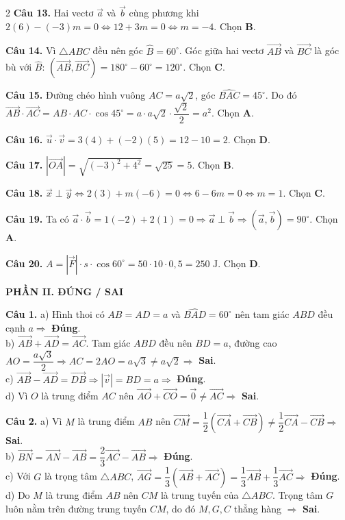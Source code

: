 \documentclass[10pt,a4paper]{article}
\begin{document}
\begin{multicols}{2}
\textbf{Câu 13.} Hai vectơ $\vec{a}$ và $\vec{b}$ cùng phương khi $2(6) - (-3)m = 0 \Leftrightarrow 12 + 3m = 0 \Leftrightarrow m = -4$. Chọn \textbf{B}.

\textbf{Câu 14.} Vì $\triangle ABC$ đều nên góc $\widehat{B} = 60^\circ$. Góc giữa hai vectơ $\vec{AB}$ và $\vec{BC}$ là góc bù với $\widehat{B}$: $(\vec{AB}, \vec{BC}) = 180^\circ - 60^\circ = 120^\circ$. Chọn \textbf{C}.

\textbf{Câu 15.} Đường chéo hình vuông $AC = a\sqrt{2}$, góc $\widehat{BAC} = 45^\circ$. Do đó $\vec{AB} \cdot \vec{AC} = AB \cdot AC \cdot \cos 45^\circ = a \cdot a\sqrt{2} \cdot \dfrac{\sqrt{2}}{2} = a^2$. Chọn \textbf{A}.

\textbf{Câu 16.} $\vec{u} \cdot \vec{v} = 3(4) + (-2)(5) = 12 - 10 = 2$. Chọn \textbf{D}.

\textbf{Câu 17.} $|\vec{OA}| = \sqrt{(-3)^2 + 4^2} = \sqrt{25} = 5$. Chọn \textbf{B}.

\textbf{Câu 18.} $\vec{x} \perp \vec{y} \Leftrightarrow 2(3) + m(-6) = 0 \Leftrightarrow 6 - 6m = 0 \Leftrightarrow m = 1$. Chọn \textbf{C}.

\textbf{Câu 19.} Ta có $\vec{a} \cdot \vec{b} = 1(-2) + 2(1) = 0 \Rightarrow \vec{a} \perp \vec{b} \Rightarrow (\vec{a}, \vec{b}) = 90^\circ$. Chọn \textbf{A}.

\textbf{Câu 20.} $A = |\vec{F}| \cdot s \cdot \cos 60^\circ = 50 \cdot 10 \cdot 0{,}5 = 250\text{ J}$. Chọn \textbf{D}.

\columnbreak

\textbf{\color{accent}PHẦN II. ĐÚNG / SAI}

\textbf{Câu 1.}
a) Hình thoi có $AB = AD = a$ và $\widehat{BAD} = 60^\circ$ nên tam giác $ABD$ đều cạnh $a \Rightarrow$ \textbf{Đúng}.\\
b) $\vec{AB} + \vec{AD} = \vec{AC}$. Tam giác $ABD$ đều nên $BD = a$, đường cao $AO = \dfrac{a\sqrt{3}}{2} \Rightarrow AC = 2AO = a\sqrt{3} \ne a\sqrt{2} \Rightarrow$ \textbf{Sai}.\\
c) $\vec{AB} - \vec{AD} = \vec{DB} \Rightarrow |\vec{v}| = BD = a \Rightarrow$ \textbf{Đúng}.\\
d) Vì $O$ là trung điểm $AC$ nên $\vec{AO} + \vec{CO} = \vec{0} \ne \vec{AC} \Rightarrow$ \textbf{Sai}.

\textbf{Câu 2.}
a) Vì $M$ là trung điểm $AB$ nên $\vec{CM} = \dfrac{1}{2}(\vec{CA} + \vec{CB}) \ne \dfrac{1}{2}\vec{CA} - \vec{CB} \Rightarrow$ \textbf{Sai}.\\
b) $\vec{BN} = \vec{AN} - \vec{AB} = \dfrac{2}{3}\vec{AC} - \vec{AB} \Rightarrow$ \textbf{Đúng}.\\
c) Với $G$ là trọng tâm $\triangle ABC$, $\vec{AG} = \dfrac{1}{3}(\vec{AB} + \vec{AC}) = \dfrac{1}{3}\vec{AB} + \dfrac{1}{3}\vec{AC} \Rightarrow$ \textbf{Đúng}.\\
d) Do $M$ là trung điểm $AB$ nên $CM$ là trung tuyến của $\triangle ABC$. Trọng tâm $G$ luôn nằm trên đường trung tuyến $CM$, do đó $M, G, C$ thẳng hàng $\Rightarrow$ \textbf{Sai}.


\end{multicols}
\end{document}

